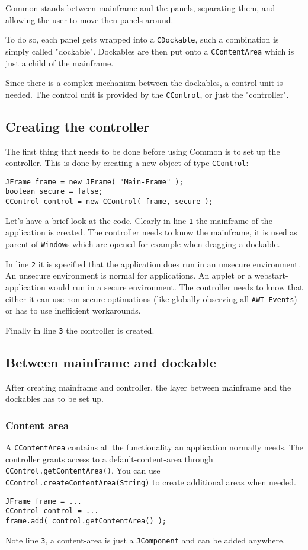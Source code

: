\documentclass[a4paper,10pt]{article}
\newcommand{\src}[1]{\lstinline[basicstyle=\ttfamily]|#1|}
\begin{document}
Common stands between mainframe and the panels, separating them, and allowing the user to move then panels around.

To do so, each panel gets wrapped into a \src{CDockable}, such a combination is simply called "dockable". Dockables are then put onto a \src{CContentArea} which is just a child of the mainframe.

Since there is a complex mechanism between the dockables, a control unit is needed. The control unit is provided by the \src{CControl}, or just the "controller".

\subsection{Creating the controller}
The first thing that needs to be done before using Common is to set up the controller. This is done by creating a new object of type \src{CControl}:
\begin{lstlisting}
JFrame frame = new JFrame( "Main-Frame" );
boolean secure = false;
CControl control = new CControl( frame, secure );
\end{lstlisting}

Let's have a brief look at the code. Clearly in line \src{1} the mainframe of the application is created. The controller needs to know the mainframe, it is used as parent of \src{Window}s which are opened for example when dragging a dockable.

In line \src{2} it is specified that the application does run in an unsecure environment. An unsecure environment is normal for applications. An applet or a webstart-application would run in a secure environment. The controller needs to know that either it  can use non-secure optimations (like globally observing all \src{AWT-Events}) or has to use inefficient workarounds.

Finally in line \src{3} the controller is created.

\subsection{Between mainframe and dockable}
After creating mainframe and controller, the layer between mainframe and the dockables has to be set up.

\subsubsection{Content area}
A \src{CContentArea} contains all the functionality an application normally needs. The controller grants access to a default-content-area through \\\src{CControl.getContentArea()}. You can use \src{CControl.createContentArea(String)} to create additional areas when needed.
\begin{lstlisting}
JFrame frame = ...
CControl control = ...	
frame.add( control.getContentArea() );
\end{lstlisting}
Note line \src{3}, a content-area is just a \src{JComponent} and can be added anywhere.
\end{document}
